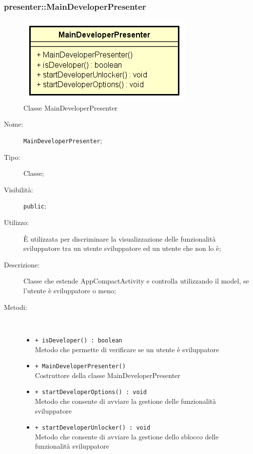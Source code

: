 \documentclass[../DefinizioneDiProdotto.tex]{subfiles}
\begin{document}
\subsubsection{presenter::MainDeveloperPresenter}

    \begin{figure}[H]
        \centering
        \includegraphics{img/MainDeveloperPresenter.png}
        \caption{Classe MainDeveloperPresenter}\label{fig:presenter::MainDeveloperPresenter} 
    \end{figure}
    \begin{description}
\item[Nome:] \texttt{MainDeveloperPresenter};
\item[Tipo:] Classe;
\item[Visibilità:] \texttt{public};
\item[Utilizzo:] È utilizzata per discriminare la visualizzazione delle funzionalità sviluppatore tra un utente sviluppatore ed un utente che non lo è;
\item[Descrizione:] Classe che estende AppCompactActivity e controlla utilizzando il model, se l'utente è sviluppatore o meno;
\item[Metodi:] \
\begin{itemize}
\item \texttt{+ isDeveloper() : boolean}\\
Metodo che permette di verificare se un utente è sviluppatore
 \item \texttt{+ MainDeveloperPresenter()}\\
Costruttore della classe MainDeveloperPresenter
 \item \texttt{+ startDeveloperOptions() : void}\\
Metodo che consente di avviare la gestione delle funzionalità sviluppatore
 \item \texttt{+ startDeveloperUnlocker() : void}\\
Metodo che consente di avviare la gestione dello sblocco delle funzionalità sviluppatore
 \end{itemize}
\end{description}
\end{document}
